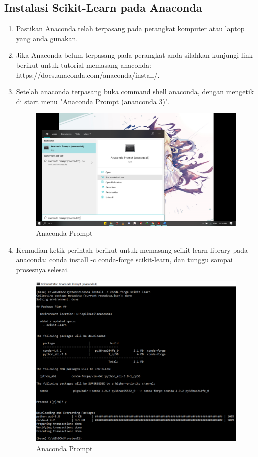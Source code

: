 \subsection{Instalasi Scikit-Learn pada Anaconda}

\begin{enumerate}
    \item Pastikan Anaconda telah terpasang pada perangkat komputer atau laptop yang anda gunakan.
    \item Jika Anaconda belum terpasang pada perangkat anda silahkan kunjungi link berikut untuk tutorial memasang anaconda: https://docs.anaconda.com/anaconda/install/.
    \item Setelah anaconda terpasang buka command shell anaconda, dengan mengetik di start menu "Anaconda Prompt (ananconda 3)".
        \begin{figure}[H]
        \centering
        \includegraphics[width=11cm]{figures/chapter1/install.png}
        \caption{Anaconda Prompt}
        \end{figure}
    \item Kemudian ketik perintah berikut untuk memasang scikit-learn library pada anaconda: conda install -c conda-forge scikit-learn, dan tunggu sampai prosesnya selesai.
        \begin{figure}[H]
        \centering
        \includegraphics[width=13cm]{figures/chapter1/1.PNG}
        \caption{Anaconda Prompt}
        \end{figure}
\end{enumerate}

